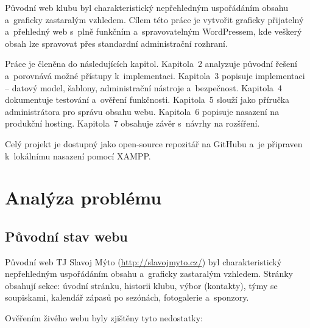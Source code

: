 \documentclass[12pt,a4paper]{article}
\begin{document}
Původní web klubu byl charakteristický nepřehledným uspořádáním obsahu a~graficky zastaralým vzhledem. Cílem této práce je vytvořit graficky přijatelný a~přehledný web s~plně funkčním a~spravovatelným WordPressem, kde veškerý obsah lze spravovat přes standardní administrační rozhraní.

Práce je členěna do následujících kapitol. Kapitola~2 analyzuje původní řešení a~porovnává možné přístupy k~implementaci. Kapitola~3 popisuje implementaci -- datový model, šablony, administrační nástroje a~bezpečnost. Kapitola~4 dokumentuje testování a~ověření funkčnosti. Kapitola~5 slouží jako příručka administrátora pro správu obsahu webu. Kapitola~6 popisuje nasazení na produkční hosting. Kapitola~7 obsahuje závěr s~návrhy na rozšíření.

Celý projekt je dostupný jako open-source repozitář na GitHubu a~je připraven k~lokálnímu nasazení pomocí XAMPP.

\clearpage
\section{Analýza problému}

\subsection{Původní stav webu}

Původní web TJ Slavoj Mýto (\url{http://slavojmyto.cz/}) byl charakteristický nepřehledným uspořádáním obsahu a~graficky zastaralým vzhledem. Stránky obsahují sekce: úvodní stránku, historii klubu, výbor (kontakty), týmy se soupiskami, kalendář zápasů po sezónách, fotogalerie a~sponzory.

Ověřením živého webu byly zjištěny tyto nedostatky:
\end{document}
